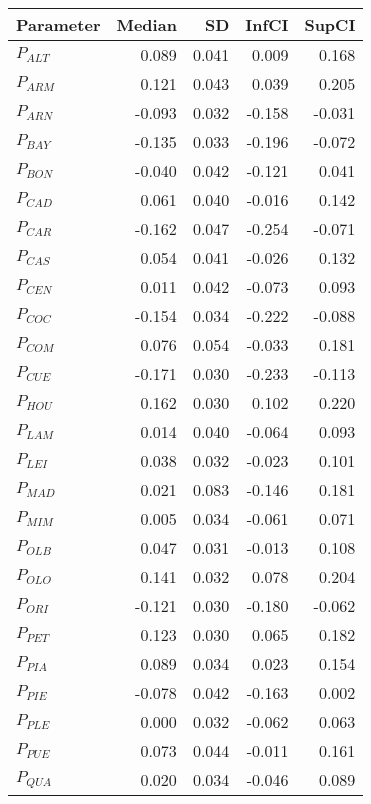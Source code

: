\begin{table}[ht]
\centering
\begin{tabular}{lrrrr}
  \hline
Parameter & Median & SD & InfCI & SupCI \\ 
  \hline
$P_{ALT}$ & 0.089 & 0.041 & 0.009 & 0.168 \\ 
  $P_{ARM}$ & 0.121 & 0.043 & 0.039 & 0.205 \\ 
  $P_{ARN}$ & -0.093 & 0.032 & -0.158 & -0.031 \\ 
  $P_{BAY}$ & -0.135 & 0.033 & -0.196 & -0.072 \\ 
  $P_{BON}$ & -0.040 & 0.042 & -0.121 & 0.041 \\ 
  $P_{CAD}$ & 0.061 & 0.040 & -0.016 & 0.142 \\ 
  $P_{CAR}$ & -0.162 & 0.047 & -0.254 & -0.071 \\ 
  $P_{CAS}$ & 0.054 & 0.041 & -0.026 & 0.132 \\ 
  $P_{CEN}$ & 0.011 & 0.042 & -0.073 & 0.093 \\ 
  $P_{COC}$ & -0.154 & 0.034 & -0.222 & -0.088 \\ 
  $P_{COM}$ & 0.076 & 0.054 & -0.033 & 0.181 \\ 
  $P_{CUE}$ & -0.171 & 0.030 & -0.233 & -0.113 \\ 
  $P_{HOU}$ & 0.162 & 0.030 & 0.102 & 0.220 \\ 
  $P_{LAM}$ & 0.014 & 0.040 & -0.064 & 0.093 \\ 
  $P_{LEI}$ & 0.038 & 0.032 & -0.023 & 0.101 \\ 
  $P_{MAD}$ & 0.021 & 0.083 & -0.146 & 0.181 \\ 
  $P_{MIM}$ & 0.005 & 0.034 & -0.061 & 0.071 \\ 
  $P_{OLB}$ & 0.047 & 0.031 & -0.013 & 0.108 \\ 
  $P_{OLO}$ & 0.141 & 0.032 & 0.078 & 0.204 \\ 
  $P_{ORI}$ & -0.121 & 0.030 & -0.180 & -0.062 \\ 
  $P_{PET}$ & 0.123 & 0.030 & 0.065 & 0.182 \\ 
  $P_{PIA}$ & 0.089 & 0.034 & 0.023 & 0.154 \\ 
  $P_{PIE}$ & -0.078 & 0.042 & -0.163 & 0.002 \\ 
  $P_{PLE}$ & 0.000 & 0.032 & -0.062 & 0.063 \\ 
  $P_{PUE}$ & 0.073 & 0.044 & -0.011 & 0.161 \\ 
  $P_{QUA}$ & 0.020 & 0.034 & -0.046 & 0.089 \\ 

\end{tabular}
\end{table}
